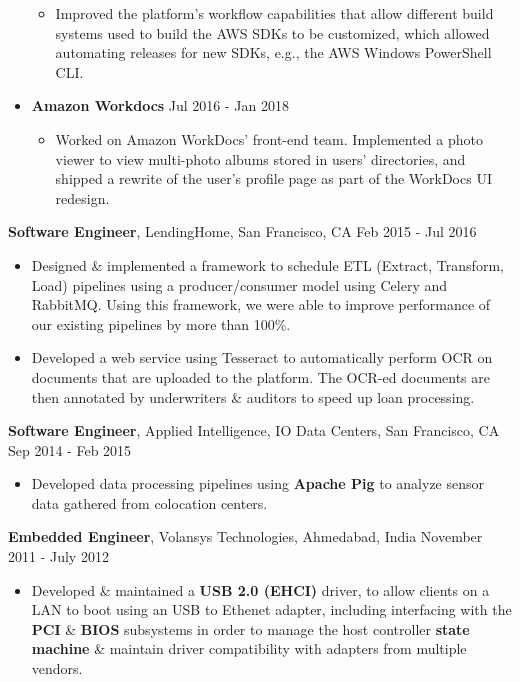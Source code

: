 \documentclass[10pt, letterpaper]{article}
\begin{document}
\begin{itemize}
\begin{itemize}[label=$\bullet$]
    \item Improved the platform's workflow capabilities that allow different build systems used to build the AWS SDKs to be customized, which allowed automating
      releases for new SDKs, e.g., the AWS Windows PowerShell CLI.
  \end{itemize}
\item \textbf{Amazon Workdocs} \hfill Jul 2016 - Jan 2018
  \begin{itemize}[label=$\bullet$]
    \item Worked on Amazon WorkDocs' front-end team. Implemented a photo viewer to view multi-photo albums stored in users' directories, and 
      shipped a rewrite of the user's profile page as part of the WorkDocs UI redesign.
  \end{itemize}
\end{itemize}
\textbf{Software Engineer}, LendingHome, San Francisco, CA \hfill Feb 2015 - Jul 2016
\begin{itemize}
\item Designed \& implemented a framework to schedule ETL (Extract, Transform, Load) pipelines using a producer/consumer model using Celery and RabbitMQ. 
  Using this framework, we were able to improve performance of our existing pipelines by more than 100\%.
\item Developed a web service using Tesseract to automatically perform OCR on documents that are uploaded to the platform. The OCR-ed documents are then annotated by underwriters \& auditors to speed up loan processing.
\end{itemize}
\textbf{Software Engineer}, Applied Intelligence, IO Data Centers, San Francisco, CA \hfill Sep 2014 - Feb 2015
\begin{itemize}
\item Developed data processing pipelines using \textbf{Apache Pig} to analyze sensor data gathered from colocation centers.
\end{itemize}
\textbf{Embedded Engineer}, Volansys Technologies, Ahmedabad, India \hfill November 2011 - July 2012
\begin{itemize}
\item Developed \& maintained a \textbf{USB 2.0 (EHCI)} driver, to allow clients on a LAN to boot using an USB to Ethenet adapter, including interfacing with the \textbf{PCI} \& \textbf{BIOS} subsystems in order to manage the host controller \textbf{state machine} \& maintain driver compatibility with adapters from multiple vendors. 
\end{itemize}
\end{document}
